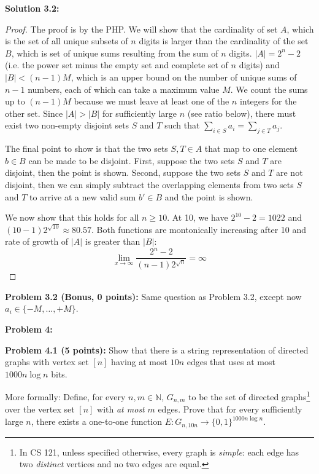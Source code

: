 \documentclass[11pt]{article}
\begin{document}
\textbf{Solution 3.2:} %
\begin{proof}
	The proof is by the PHP. We will show that the cardinality of set $A$, which is the set of all unique subsets of $n$ digits is larger than the cardinality of the set $B$, which is set of unique sums resulting from the sum of $n$ digits. $|A| = 2^n - 2$ (i.e. the power set minus the empty set and complete set of $n$ digits) and $|B| < (n - 1)M$, which is an upper bound on the number of unique sums of $n-1$ numbers, each of which can take a maximum value $M$. We count the sums up to $(n-1)M$ because we must leave at least one of the $n$ integers for the other set.
	Since $|A| > |B|$ for sufficiently large $n$ (see ratio below), there must exist two non-empty disjoint sets $S$ and $T$ such that $\sum_{i \in S} a_i = \sum_{j \in T} a_j$.
	
	The final point to show is that the two sets $S, T \in A$ that map to one element $b \in B$ can be made to be disjoint. First, suppose the two sets $S$ and $T$ are disjoint, then the point is shown. Second, suppose the two sets $S$ and $T$ are not disjoint, then we can simply subtract the overlapping elements from two sets $S$ and $T$ to arrive at a new valid sum $b' \in B$ and the point is shown. 

	We now show that this holds for all $n \geq 10$. At 10, we have $2^{10} - 2 = 1022$ and $(10 - 1)2^{\sqrt{10}} \approx 80.57 $. Both functions are montonically increasing after 10 and rate of growth of $|A|$ is greater than $|B|$:
	$$\lim_{x \to \infty} \frac{2^n - 2}{(n - 1)2^{\sqrt{n}}} = \infty$$
\end{proof}

\textbf{Problem 3.2 (Bonus, 0 points):} Same question as Problem 3.2, except now $a_i \in \{-M,\ldots,+M\}$.

\newpage

\textbf{Problem 4:}

\newcommand{\N}{\mathbb{N}}

\textbf{Problem 4.1 (5 points):}
Show that there is a string
representation of directed graphs with vertex set $[n]$ having at most
 $10n$ edges that uses at most $1000n \log n$ bits.

More formally: Define, for every $n,m \in \N$, $G_{n,m}$ to be the set of directed graphs\footnote{In CS 121, unless specified otherwise, every graph is \emph{simple}: each edge has two \emph{distinct} vertices and no two edges are equal.} over the vertex
set $[n]$ with {\em at most} $m$ edges. Prove that for
every sufficiently large $n$, there exists a one-to-one function $E:G_{n, 10n} \to \{0,1\}^{1000n\log n}$.
\end{document}
